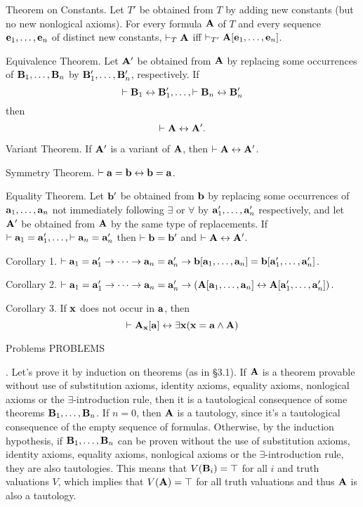\proclaim Theorem on Constants. Let $T'$ be obtained from $T$ by adding new constants (but no new nonlogical axioms).
For every formula ${\bf A}$ of $T$ and every sequence ${\bf e}_1, \dots, {\bf e}_n$ of distinct new constants, 
$\vdash_T {\bf A}$ iff $\vdash_{T'} {\bf A}[{\bf e}_1, \dots, {\bf e}_n]$.


\proclaim Equivalence Theorem. Let ${\bf A}'$ be obtained from ${\bf A}$ by replacing some occurrences of ${\bf B}_1, \dots, {\bf B}_n$
by ${\bf B}_1', \dots, {\bf B}_n'$, respectively. If
$$
\vdash {\bf B}_1 \leftrightarrow {\bf B}_1', \dots, \vdash {\bf B}_n \leftrightarrow {\bf B}_n'
$$
then
$$
\vdash {\bf A} \leftrightarrow {\bf A}'.
$$

\proclaim Variant Theorem. If ${\bf A}'$ is a variant of ${\bf A}$, then $\vdash {\bf A} \leftrightarrow {\bf A}'$.

\proclaim Symmetry Theorem. $\vdash {\bf a} = {\bf b} \leftrightarrow {\bf b} = {\bf a}$.

\proclaim Equality Theorem. Let ${\bf b}'$ be obtained from ${\bf b}$ by replacing some occurrences of ${\bf a}_1, \dots, {\bf a}_n$
not immediately following $\exists$ or $\forall$ by ${\bf a}_1', \dots, {\bf a}_n'$ respectively, and let ${\bf A}'$ be
obtained from ${\bf A}$ by the same type of replacements. If $\vdash {\bf a}_1 = {\bf a}_1', \dots, \vdash {\bf a}_n = {\bf a}_n'$ then
$\vdash {\bf b} = {\bf b}'$ and $\vdash {\bf A} \leftrightarrow {\bf A}'$.

\proclaim Corollary 1. $\vdash {\bf a}_1 = {\bf a}_1' \to \cdots \to {\bf a}_n = {\bf a}_n' \to {\bf b}[{\bf a}_1, \dots, {\bf a}_n] = {\bf b}[{\bf a}_1', \dots, {\bf a}_n']$.

\proclaim Corollary 2. $\vdash {\bf a}_1 = {\bf a}_1' \to \cdots \to {\bf a}_n = {\bf a}_n' \to ({\bf A}[{\bf a}_1, \dots, {\bf a}_n] \leftrightarrow {\bf A}[{\bf a}_1', \dots, {\bf a}_n'])$.

\proclaim Corollary 3. If ${\bf x}$ does not occur in ${\bf a}$, then
$$
\vdash {\bf A}_{\bf x}[{\bf a}] \leftrightarrow \exists{\bf x} ({\bf x}={\bf a} \land {\bf A})
$$

\vfill
\break

 {Problems}
\beginsection PROBLEMS

. Let's prove it by induction on theorems (as in \S3.1).
If ${\bf A}$ is a theorem provable without use of substitution axioms, 
identity axioms, equality axioms, nonlogical axioms or the $\exists$-introduction 
rule, then it is a tautological consequence of some theorems ${\bf B}_1, \dots, {\bf B}_n$.
If $n=0$, then ${\bf A}$ is a tautology, since it's a tautological consequence of the
empty sequence of formulas. Otherwise, by the induction hypothesis, if 
${\bf B}_1, \dots, {\bf B}_n$ can be proven without the use of substitution axioms, identity 
axioms, equality axioms, nonlogical axioms or the $\exists$-introduction rule, 
they are also tautologies. This means that $V({\bf B}_i) = \top$ for all $i$ and truth
valuations $V$, which implies that $V({\bf A}) = \top$ for all truth valuations and thus
${\bf A}$ is also a tautology.
\medskip

